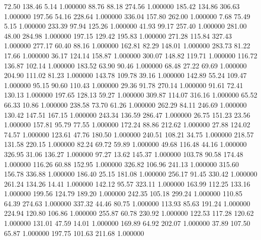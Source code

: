      72.50    138.46      5.14  1.000000
     88.76     88.18    274.56  1.000000
    185.42    134.86    306.63  1.000000
    197.56     54.16    228.64  1.000000
    336.04    157.80    262.00  1.000000
      7.68     75.49      5.15  1.000000
    233.39     97.94    125.26  1.000000
     41.93     99.17    257.40  1.000000
    281.00     48.00    284.98  1.000000
    197.15    129.42    195.83  1.000000
    271.28    115.84    327.43  1.000000
    277.17     60.40     88.16  1.000000
    162.81     82.29    148.01  1.000000
    283.73     81.22     17.66  1.000000
     36.17    124.14    158.87  1.000000
    300.07    148.82    119.71  1.000000
    116.72    136.87    102.14  1.000000
    183.52     63.90     90.46  1.000000
     68.48     27.22     69.69  1.000000
    204.90    111.02     81.23  1.000000
    143.78    109.78     39.16  1.000000
    142.89     55.24    109.47  1.000000
     95.15     90.60    110.43  1.000000
     29.36     91.78    270.14  1.000000
     91.61     72.41    130.13  1.000000
    197.65    128.13     59.27  1.000000
    309.87    114.07    316.16  1.000000
     65.52     66.33     10.86  1.000000
    238.58     73.70     61.26  1.000000
    262.29     84.11    246.69  1.000000
    130.42    147.51    167.15  1.000000
    243.34    136.59    286.47  1.000000
     26.75    151.23     23.56  1.000000
    157.81     95.79     77.55  1.000000
    172.24     88.86    212.62  1.000000
     27.88    124.02     74.57  1.000000
    123.61     47.76    180.50  1.000000
    240.51    108.21     34.75  1.000000
    218.57    131.58    220.15  1.000000
     82.24     69.72     59.89  1.000000
     49.68    116.48     44.16  1.000000
    326.95     31.06    136.27  1.000000
     97.27     13.62    145.37  1.000000
    103.78     90.58    174.48  1.000000
    116.26     60.88    152.95  1.000000
    326.82    106.96    241.13  1.000000
    315.60    156.78    336.88  1.000000
    186.40     25.15    181.08  1.000000
    256.17     91.45    330.42  1.000000
    261.24    134.26     14.41  1.000000
    142.12     95.57    323.11  1.000000
    163.99    112.25    133.16  1.000000
    199.56    124.79    189.20  1.000000
    242.35    105.18    299.24  1.000000
    110.85     64.39    274.63  1.000000
    337.32     44.46     80.75  1.000000
    113.93     85.63    191.24  1.000000
    224.94    120.80    106.86  1.000000
    255.87     60.78    230.92  1.000000
    122.53    117.28    120.62  1.000000
    131.01     47.59     14.01  1.000000
    169.89     64.92    202.07  1.000000
     37.89    107.50     65.87  1.000000
    197.75    101.63    211.68  1.000000
